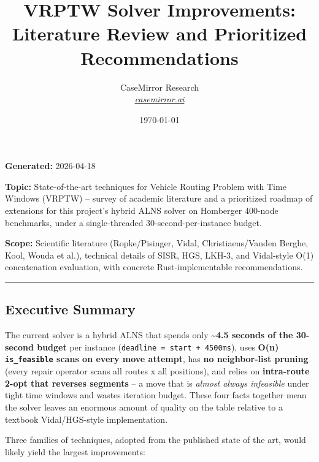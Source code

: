 \documentclass[twocolumn,10pt,letterpaper]{article}
\title{\vspace{-1.8em}\LARGE\bfseries\color{titlebg} VRPTW Solver Improvements: Literature Review and Prioritized Recommendations\vspace{-0.3em}}
\author{CaseMirror Research \\ \small\itshape\href{https://casemirror.ai}{\textcolor{headergray}{casemirror.ai}}}
\date{{\small\color{headergray} \today}}
\begin{document}
\maketitle
\thispagestyle{firstpage}
\vspace{-0.5em}


\textbf{Generated:} 2026-04-18

\textbf{Topic:} State-of-the-art techniques for Vehicle Routing Problem with Time Windows (VRPTW) -- survey of academic literature and a prioritized roadmap of extensions for this project's hybrid ALNS solver on Homberger 400-node benchmarks, under a single-threaded 30-second-per-instance budget.

\textbf{Scope:} Scientific literature (Ropke/Pisinger, Vidal, Christiaens/Vanden Berghe, Kool, Wouda et al.), technical details of SISR, HGS, LKH-3, and Vidal-style O(1) concatenation evaluation, with concrete Rust-implementable recommendations.


\vspace{0.5em}
\noindent\rule{\columnwidth}{0.4pt}
\vspace{0.5em}

\subsection{Executive Summary}

The current solver is a hybrid ALNS that spends only \textbf{\textasciitilde{}4.5 seconds of the 30-second budget} per instance (\texttt{deadline = start + 4500ms}), uses \textbf{O(n) \texttt{is\_feasible} scans on every move attempt}, has \textbf{no neighbor-list pruning} (every repair operator scans all routes x all positions), and relies on \textbf{intra-route 2-opt that reverses segments} -- a move that is \textit{almost always infeasible} under tight time windows and wastes iteration budget. These four facts together mean the solver leaves an enormous amount of quality on the table relative to a textbook Vidal/HGS-style implementation.


Three families of techniques, adopted from the published state of the art, would likely yield the largest improvements:
\end{document}
